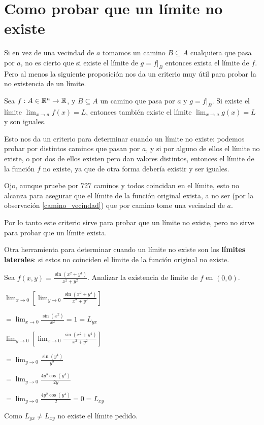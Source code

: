\section{Como probar que un límite no existe}

Si en vez de una vecindad de $a$ tomamos un camino $B \subseteq A$ cualquiera que pasa por $a$, no es cierto que si existe el límite de $g = f|_B$ entonces exista el límite de $f$.  Pero al menos la siguiente proposición nos da un criterio muy útil para probar la no existencia de un límite.

\begin{proposition}
Sea $ f : A \in \mathbb{R}^n \to \mathbb{R}$, y $B \subseteq A$ un camino que pasa por $a$ y $g = f|_B$.  Si existe el límite $ \lim_{x \to a} f(x) = L$, entonces también existe el límite $ \lim_{x \to a} g(x) = L$ y son iguales.
\end{proposition}

Esto nos da un criterio para determinar cuando un límite no existe: podemos probar por distintos caminos que pasan por $a$, y si por alguno de ellos el límite no existe, o por dos de ellos existen pero dan valores distintos, entonces el límite de la función $f$ no existe, ya que de otra forma debería existir y ser iguales.

Ojo, aunque pruebe por 727 caminos y todos coincidan en el límite, esto no alcanza para asegurar que el límite de la función original exista, a no ser (por la observación \ref{camino_vecindad}) que por camino tome una vecindad de $a$.

Por lo tanto este criterio sirve para probar que un límite no existe, pero no sirve para probar que un límite exista.

Otra herramienta para determinar cuando un límite no existe son los \textbf{límites laterales}: si estos no coinciden el límite de la función original no existe.

\begin{example}
Sea $ f(x,y) = \frac{ \sin(x^2 + y^4) }{ x^2 + y^2 }$.  Analizar la existencia de límite de $ f$ en $ (0,0)$.

$ \lim_{x \to 0} \left[ \lim_{y \to 0} \frac{ \sin(x^2 + y^4) }{ x^2 + y^2 } \right]$

$ = \lim_{x \to 0} \frac{ \sin(x^2)  }{ x^2 } = 1 = L_{yx}$

$ \lim_{y \to 0} \left[ \lim_{x \to 0} \frac{ \sin(x^2 + y^4) }{ x^2 + y^2 } \right]$

$ = \lim_{y \to 0} \frac{ \sin(y^4) }{ y^2 } $

$ = \lim_{y \to 0} \frac{ 4y^3 \cos(y^4) }{ 2y } $

$ = \lim_{y \to 0} \frac{ 4y^2 \cos(y^4) }{ 2 } = 0 = L_{xy}$

Como $L_{yx} \neq L_{xy}$ no existe el límite pedido.
\end{example}

